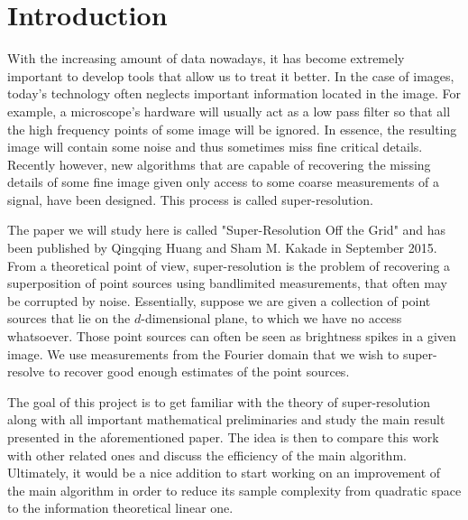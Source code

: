 \chapter{Introduction}
With the increasing amount of data nowadays, it has become extremely important to develop tools that allow us to treat it better. In the case of images, today's technology often neglects important information located in the image. For example, a microscope's hardware will usually act as a low pass filter so that all the high frequency points of some image will be ignored. In essence, the resulting image will contain some noise and thus sometimes miss fine critical details. Recently however, new algorithms that are capable of recovering the missing details of some fine image given only access to some coarse measurements of a signal, have been designed. This process is called super-resolution.\par 

The paper we will study here is called "Super-Resolution Off the Grid" and has been published by Qingqing Huang and Sham M. Kakade in September 2015. From a theoretical point of view, super-resolution is the problem of recovering a superposition of point sources using bandlimited measurements, that often may be corrupted by noise. Essentially, suppose we are given a collection of point sources that lie on the $d$-dimensional plane, to which we have no access whatsoever. Those point sources can often be seen as brightness spikes in a given image. We use measurements from the Fourier domain that we wish to super-resolve to recover good enough estimates of the point sources.\par 

The goal of this project is to get familiar with the theory of super-resolution along with all important mathematical preliminaries and study the main result presented in the aforementioned paper. The idea is then to compare this work with other related ones and discuss the efficiency of the main algorithm. Ultimately, it would be a nice addition to start working on an improvement of the main algorithm in order to reduce its sample complexity from quadratic space to the information theoretical linear one.